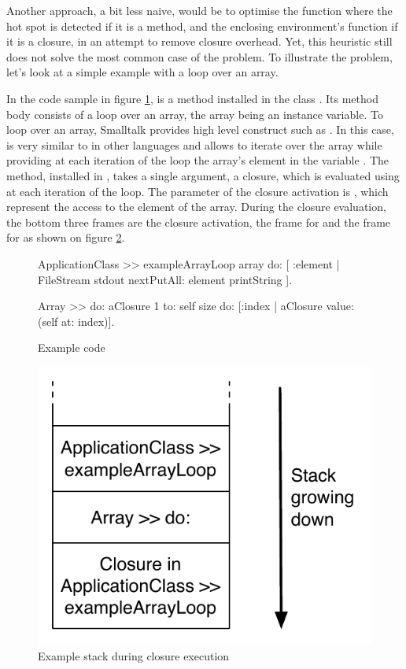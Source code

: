 \documentclass[a4paper,12pt,twoside]{../includes/ThesisStyle}
\begin{document}
Another approach, a bit less naive, would be to optimise the function where the hot spot is detected if it is a method, and the enclosing environment's function if it is a closure, in an attempt to remove closure overhead. Yet, this heuristic still does not solve the most common case of the problem. To illustrate the problem, let's look at a simple example with a loop over an array.

In the code sample in figure \ref{fig:ExampleCode},  is a method installed in the class . Its method body consists of a loop over an array, the array being an instance variable. To loop over an array, Smalltalk provides high level construct such as . In this case,  is very similar to  in other languages and allows to iterate over the array while providing at each iteration of the loop the array's element in the variable . The  method, installed in , takes a single argument, a closure, which is evaluated using  at each iteration of the loop. The parameter of the closure activation is , which represent the access to the element  of the array. During the closure evaluation, the bottom three frames are the closure activation, the frame for  and the frame for  as shown on figure \ref{fig:ExampleLoopStack}.

\begin{figure}[h!]
    \begin{center}
        \begin{code}
        	ApplicationClass >> exampleArrayLoop
        	    array do: [ :element | FileStream stdout nextPutAll: element printString ].
        		
        	Array >> do: aClosure
        	    1 to: self size do: [:index | aClosure value: (self at: index)].
        \end{code}   
	\caption{Example code}
        \label{fig:ExampleCode}
    \end{center}
\end{figure}

\begin{figure}[h!]
    \begin{center}
        \includegraphics[width=0.42\linewidth]{ExampleLoopStack}
        \caption{Example stack during closure execution}
        \label{fig:ExampleLoopStack}
    \end{center}
\end{figure}
\end{document}
